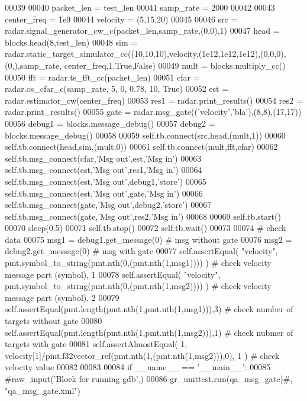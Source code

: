 \begin{DoxyCode}
00039 
00040         packet\_len = test\_len
00041         samp\_rate = 2000
00042         
00043         center\_freq = 1e9
00044         velocity = (5,15,20)
00045 
00046         src = radar.signal\_generator\_cw\_c(packet\_len,samp\_rate,(0,0),1)
00047         head = blocks.head(8,test\_len)
00048         sim = radar.static\_target\_simulator\_cc((10,10,10),velocity,(1e12,1e12,1e12),(0,0,0),(0,),samp\_rate,
      center\_freq,1,\textcolor{keyword}{True},\textcolor{keyword}{False})
00049         mult = blocks.multiply\_cc()
00050         fft = radar.ts\_fft\_cc(packet\_len)
00051         cfar = radar.os\_cfar\_c(samp\_rate, 5, 0, 0.78, 10, \textcolor{keyword}{True})
00052         est = radar.estimator\_cw(center\_freq)
00053         res1 = radar.print\_results()
00054         res2 = radar.print\_results()
00055         gate = radar.msg\_gate((\textcolor{stringliteral}{'velocity'},\textcolor{stringliteral}{'bla'}),(8,8),(17,17))
00056         debug1 = blocks.message\_debug()
00057         debug2 = blocks.message\_debug()
00058 
00059         self.tb.connect(src,head,(mult,1))
00060         self.tb.connect(head,sim,(mult,0))
00061         self.tb.connect(mult,fft,cfar)
00062         self.tb.msg\_connect(cfar,\textcolor{stringliteral}{'Msg out'},est,\textcolor{stringliteral}{'Msg in'})
00063         self.tb.msg\_connect(est,\textcolor{stringliteral}{'Msg out'},res1,\textcolor{stringliteral}{'Msg in'})
00064         self.tb.msg\_connect(est,\textcolor{stringliteral}{'Msg out'},debug1,\textcolor{stringliteral}{'store'})
00065         self.tb.msg\_connect(est,\textcolor{stringliteral}{'Msg out'},gate,\textcolor{stringliteral}{'Msg in'})
00066         self.tb.msg\_connect(gate,\textcolor{stringliteral}{'Msg out'},debug2,\textcolor{stringliteral}{'store'})
00067         self.tb.msg\_connect(gate,\textcolor{stringliteral}{'Msg out'},res2,\textcolor{stringliteral}{'Msg in'})
00068 
00069         self.tb.start()
00070         sleep(0.5)
00071         self.tb.stop()
00072         self.tb.wait()
00073         
00074         \textcolor{comment}{# check data}
00075         msg1 = debug1.get\_message(0) \textcolor{comment}{# msg without gate}
00076         msg2 = debug2.get\_message(0) \textcolor{comment}{# msg with gate}
00077         self.assertEqual( \textcolor{stringliteral}{"velocity"}, pmt.symbol\_to\_string(pmt.nth(0,(pmt.nth(1,msg1)))) ) \textcolor{comment}{# check velocity
       message part (symbol), 1}
00078         self.assertEqual( \textcolor{stringliteral}{"velocity"}, pmt.symbol\_to\_string(pmt.nth(0,(pmt.nth(1,msg2)))) ) \textcolor{comment}{# check velocity
       message part (symbol), 2}
00079         self.assertEqual(pmt.length(pmt.nth(1,pmt.nth(1,msg1))),3) \textcolor{comment}{# check number of targets without gate}
00080         self.assertEqual(pmt.length(pmt.nth(1,pmt.nth(1,msg2))),1) \textcolor{comment}{# check nubmer of targets with gate}
00081         self.assertAlmostEqual( 1, velocity[1]/pmt.f32vector\_ref(pmt.nth(1,(pmt.nth(1,msg2))),0), 1 ) \textcolor{comment}{#
       check velocity value}
00082 
00083 
00084 \textcolor{keywordflow}{if} \_\_name\_\_ == \textcolor{stringliteral}{'\_\_main\_\_'}:
00085     \textcolor{comment}{#raw\_input('Block for running gdb',)}
00086     gr\_unittest.run(qa\_msg\_gate)\textcolor{comment}{#, "qa\_msg\_gate.xml")}
\end{DoxyCode}
